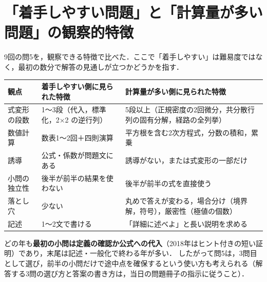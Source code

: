 \documentclass[a4paper,11pt,openany]{ltjsbook}
\begin{document}
\section{「着手しやすい問題」と「計算量が多い問題」の観察的特徴}\label{sec:G-features}
9回の問5を，観察できる特徴で比べた．ここで「着手しやすい」は難易度ではなく，最初の数分で解答の見通しが立つかどうかを指す．
\begin{center}\small
\begin{tabular}{@{}L{25mm}L{55mm}L{58mm}@{}}
\toprule
観点 & 着手しやすい側に見られた特徴 & 計算量が多い側に見られた特徴\\
\midrule
式変形の段数 & 1〜3段（代入，標準化，2×2 の逆行列） & 5段以上（正規密度の2回微分，共分散行列の固有分解，経路の全列挙）\\
数値計算 & 数表1〜2回＋四則演算 & 平方根を含む2次方程式，分数の積和，累乗\\
誘導 & 公式・係数が問題文にある & 誘導がない，または式変形の一部だけ\\
小問の独立性 & 後半が前半の結果を使わない & 後半が前半の式を直接使う\\
落とし穴 & 少ない & 丸めで答えが変わる，場合分け（境界解，符号），厳密性（極値の個数）\\
記述 & 1〜2文で書ける & 「詳細に述べよ」と長い説明を求める\\
\bottomrule
\end{tabular}
\end{center}
どの年も\textbf{最初の小問は定義の確認か公式への代入}（2018年はヒント付きの短い証明）であり，末尾は記述・一般化で終わる年が多い．
したがって問5は，3問目として選び，前半の小問だけで途中点を確保するという使い方も考えられる（解答する3問の選び方と答案の書き方は，当日の問題冊子の指示に従うこと）．
\end{document}

